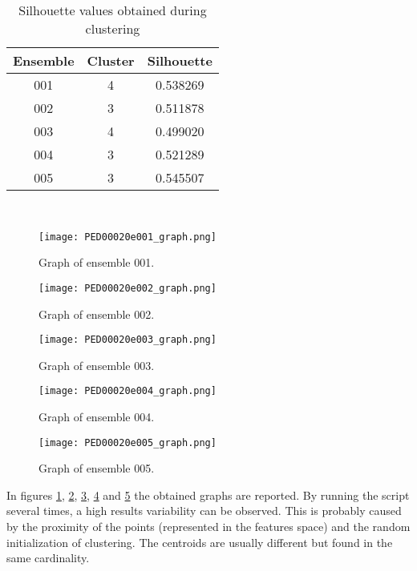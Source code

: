 \begin{table}[H]
\begin{center}
\begin{tabular}{ccc}
\textbf{Ensemble} & \textbf{Cluster} & \textbf{Silhouette}\\
\hline
001 & 4 & 0.538269\\
\hline
002 & 3 & 0.511878\\
\hline
003 & 4 & 0.499020\\
\hline
004 & 3 & 0.521289\\
\hline
005 & 3 & 0.545507\\
\end{tabular}
\end{center}
\caption{Silhouette values obtained during clustering}~\label{tab:silhouette}
\end{table}

\begin{figure}[H]
    \centering
	\texttt{[image: PED00020e001\_graph.png]}
	\caption{Graph of ensemble 001.}
	\label{model001}
\end{figure}

\begin{figure}[H]
    \centering
		\texttt{[image: PED00020e002\_graph.png]}
		\caption{Graph of ensemble 002.}
		\label{model002}
\end{figure}

\begin{figure}[H]
    \centering
		\texttt{[image: PED00020e003\_graph.png]}
		\caption{Graph of ensemble 003.}
		\label{model003}
\end{figure}

\begin{figure}[H]
    \centering
		\texttt{[image: PED00020e004\_graph.png]}
		\caption{Graph of ensemble 004.}
		\label{model004}
\end{figure}

\begin{figure}[H]
    \centering
		\texttt{[image: PED00020e005\_graph.png]}
		\caption{Graph of ensemble 005.}
		\label{model005}
\end{figure}


In figures \ref{model001}, \ref{model002}, \ref{model003}, \ref{model004} and \ref{model005} the obtained graphs are reported. By running the script several times, a high results variability can be observed.
This is probably caused by the proximity of the points (represented in the features space) and the random initialization of clustering. The centroids are usually different but found in the same cardinality.



